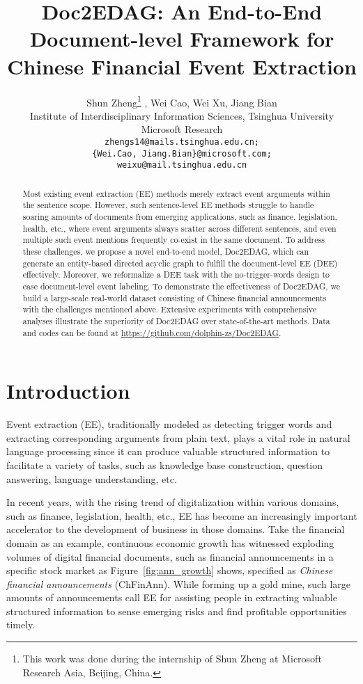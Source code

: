 \documentclass[11pt,a4paper]{article}
\title{Doc2EDAG: An End-to-End Document-level Framework for \\
Chinese Financial Event Extraction}
\author{
Shun Zheng\thanks{This work was done during the internship of Shun Zheng at Microsoft Research Asia, Beijing, China.} ,
Wei Cao,
Wei Xu,
Jiang Bian \\
Institute of Interdisciplinary Information Sciences, Tsinghua University\\
Microsoft Research\\
{\tt zhengs14@mails.tsinghua.edu.cn;} \\
{\tt \{Wei.Cao, Jiang.Bian\}@microsoft.com;}\\
{\tt weixu@mail.tsinghua.edu.cn}
}
\date{}
\begin{document}
\maketitle

\begin{abstract}
Most existing event extraction (EE) methods merely extract event arguments within the sentence scope. However, such sentence-level EE methods struggle to handle soaring amounts of documents from emerging applications, such as finance, legislation, health, etc., where event arguments always scatter across different sentences, and even multiple such event mentions frequently co-exist in the same document. To address these challenges, we propose a novel end-to-end model, Doc2EDAG, which can generate an entity-based directed acyclic graph to fulfill the document-level EE (DEE) effectively. Moreover, we reformalize a DEE task with the no-trigger-words design to ease document-level event labeling. To demonstrate the effectiveness of Doc2EDAG, we build a large-scale real-world dataset consisting of Chinese financial announcements with the challenges mentioned above. Extensive experiments with comprehensive analyses illustrate the superiority of Doc2EDAG over state-of-the-art methods.
Data and codes can be found at \url{https://github.com/dolphin-zs/Doc2EDAG}.
\end{abstract}

\section{Introduction}

Event extraction (EE), traditionally modeled as detecting trigger words and extracting corresponding arguments from plain text, plays a vital role in natural language processing since it can produce valuable structured information to facilitate a variety of tasks, such as knowledge base construction, question answering, language understanding, etc.

In recent years, with the rising trend of digitalization within various domains, such as finance, legislation, health, etc., EE has become an increasingly important accelerator to the development of business in those domains.  
Take the financial domain as an example, continuous economic growth has witnessed exploding volumes of digital financial documents, such as financial announcements in a specific stock market as Figure~\ref{fig:ann_growth} shows, specified as \textit{Chinese financial announcements} (ChFinAnn).
While forming up a gold mine, such large amounts of announcements call EE for assisting people in extracting valuable structured information to sense emerging risks and find profitable opportunities timely.
\end{document}
